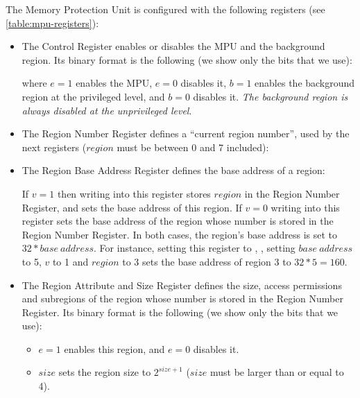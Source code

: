 The Memory Protection Unit is configured with the following registers (see
\cref{table:mpu-registers}):
\begin{itemize}
  \item The Control Register enables or disables the MPU and the background
  region. Its binary format is the following (we show only the bits that we
  use):


  where $e=1$ enables the MPU, $e=0$ disables it, $b=1$ enables the background
  region at the privileged level, and $b=0$ disables it. {\em The background
  region is always disabled at the unprivileged level}.

  \item The Region Number Register defines a ``current region number'', used by
  the next registers ($\mathit{region}$ must be between 0 and 7 included):


  \item The Region Base Address Register defines the base address of a region:


  If $v=1$ then writing into this register stores $\mathit{region}$ in the
  Region Number Register, and sets the base address of this region. If $v=0$
  writing into this register sets the base address of the region whose number
  is stored in the Region Number Register. In both cases, the region's base
  address is set to $32 * \mathit{base\ address}$. For instance, setting this
  register to , \ie, setting $\mathit{base\ address}$ to 5, $v$ to 1
  and $\mathit{region}$ to 3 sets the base address of region 3 to $32*5=160$.

  \item The Region Attribute and Size Register defines the size, access
  permissions and subregions of the region whose number is stored in the Region
  Number Register. Its binary format is the following (we show only the bits
  that we use):


  \begin{itemize}
    \item $e=1$ enables this region, and $e=0$ disables it.

    \item $\mathit{size}$ sets the region size to $2^{\mathit{size}+1}$
    ($\mathit{size}$ must be larger than or equal to 4).


\end{itemize}
\end{itemize}

